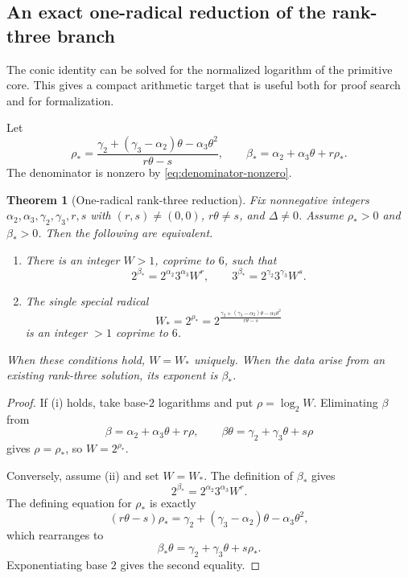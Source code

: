 \documentclass[11pt,oneside]{article}
\theoremstyle{research}
\newtheorem{theorem}{Theorem}[section]
\theoremstyle{definition}
\begin{document}
\subsection{An exact one-radical reduction of the rank-three branch}

The conic identity can be solved for the normalized logarithm of the primitive
core.  This gives a compact arithmetic target that is useful both for proof
search and for formalization.

Let
\begin{equation}
 \rho_*=\frac{
  \gamma_2+(\gamma_3-\alpha_2)\theta-\alpha_3\theta^2
 }{r\theta-s},
 \qquad
 \beta_*=\alpha_2+\alpha_3\theta+r\rho_*.
 \label{eq:rho-beta-star}
\end{equation}
The denominator is nonzero by \eqref{eq:denominator-nonzero}.

\begin{theorem}[One-radical rank-three reduction]
\label{thm:rank3-special-radical}
Fix nonnegative integers
$\alpha_2,\alpha_3,\gamma_2,\gamma_3,r,s$ with $(r,s)\ne(0,0)$,
$r\theta\ne s$, and $\Delta\ne0$.  Assume $\rho_*>0$ and $\beta_*>0$.
Then the following are equivalent.
\begin{enumerate}[label=(\roman*)]
\item There is an integer $W>1$, coprime to $6$, such that
\[
 2^{\beta_*}=2^{\alpha_2}3^{\alpha_3}W^r,
 \qquad
 3^{\beta_*}=2^{\gamma_2}3^{\gamma_3}W^s.
\]
\item The single special radical
\begin{equation}
 W_*=2^{\rho_*}
 =2^{\frac{
  \gamma_2+(\gamma_3-\alpha_2)\theta-\alpha_3\theta^2
 }{r\theta-s}}
 \label{eq:rank3-special-radical}
\end{equation}
is an integer $>1$ coprime to $6$.
\end{enumerate}
When these conditions hold, $W=W_*$ uniquely.  When the data arise from an
existing rank-three solution, its exponent is $\beta_*$.
\end{theorem}

\begin{proof}
If (i) holds, take base-$2$ logarithms and put
$\rho=\log_2 W$.  Eliminating $\beta$ from
\[
 \beta=\alpha_2+\alpha_3\theta+r\rho,
 \qquad
 \beta\theta=\gamma_2+\gamma_3\theta+s\rho
\]
gives $\rho=\rho_*$, so $W=2^{\rho_*}$.

Conversely, assume (ii) and set $W=W_*$.  The definition of $\beta_*$ gives
\[
 2^{\beta_*}=2^{\alpha_2}3^{\alpha_3}W^r.
\]
The defining equation for $\rho_*$ is exactly
\[
 (r\theta-s)\rho_*
 =\gamma_2+(\gamma_3-\alpha_2)\theta-\alpha_3\theta^2,
\]
which rearranges to
\[
 \beta_*\theta=\gamma_2+\gamma_3\theta+s\rho_*.
\]
Exponentiating base $2$ gives the second equality.
\end{proof}
\end{document}
